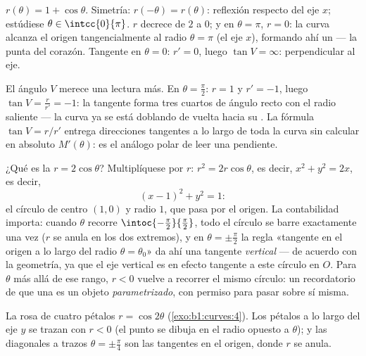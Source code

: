 \begin{example}[La cardioide]\label{ex:b1:curves:cardioid}
$r(\theta) = 1 + \cos\theta$. Simetría:
$r(-\theta) = r(\theta)$: reflexión respecto del eje $x$; estúdiese
$\theta \in \intcc{0}{\pi}$. $r$ decrece de $2$ a $0$; y en
$\theta = \pi$, $r = 0$: la curva alcanza el origen tangencialmente
al radio $\theta = \pi$ (el eje $x$), formando ahí un
 --- la punta del corazón. Tangente en
$\theta = 0$: $r' = 0$, luego $\tan V = \infty$: perpendicular al eje.

El ángulo $V$ merece una lectura más. En $\theta = \frac\pi2$:
$r = 1$ y $r' = -1$, luego $\tan V = \frac{r}{r'} = -1$: la tangente
forma tres cuartos de ángulo recto con el radio saliente --- la curva
ya se está doblando de vuelta hacia su . La
fórmula $\tan V = r/r'$ entrega direcciones tangentes a lo largo de
toda la curva sin calcular en absoluto $M'(\theta)$: es el análogo
polar de leer una pendiente.
\end{example}

\begin{example}
\label{ex:b1:curves:polarcircle}
¿Qué es la  $r = 2\cos\theta$? Multiplíquese por $r$:
$r^2 = 2r\cos\theta$, es decir, $x^2 + y^2 = 2x$, es decir,
\[
(x - 1)^2 + y^2 = 1 :
\]
el círculo de centro $(1, 0)$ y radio $1$, que pasa por el origen. La
contabilidad importa: cuando $\theta$ recorre
$\intoc{-\frac\pi2}{\frac\pi2}$, todo el círculo se barre exactamente
una vez ($r$ se anula en los dos extremos), y en
$\theta = \pm\frac\pi2$ la regla «tangente en el origen a lo largo
del radio $\theta = \theta_0$» da ahí una tangente \emph{vertical}
--- de acuerdo con la geometría, ya que el eje vertical es en efecto
tangente a este círculo en $O$. Para $\theta$ más allá de ese rango,
$r < 0$ vuelve a recorrer el mismo círculo: un recordatorio de que
una  es un objeto \emph{parametrizado}, con permiso para
pasar sobre sí misma.
\end{example}

\begin{omfigure}

{\small La rosa de cuatro pétalos $r = \cos 2\theta$
(\cref{exo:b1:curves:4}). Los pétalos a lo largo del eje $y$ se
trazan con $r < 0$ (el punto se dibuja en el radio opuesto a
$\theta$); y las diagonales a trazos $\theta = \pm\frac\pi4$ son las
tangentes en el origen, donde $r$ se anula.}
\end{omfigure}

